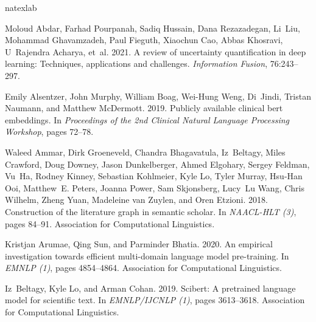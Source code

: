 \documentclass[11pt]{article}
\begin{document}
\vspace{-4mm}
\begin{thebibliography}{59}
\expandafter\ifx\csname natexlab\endcsname\relax\def\natexlab#1{#1}\fi

Moloud Abdar, Farhad Pourpanah, Sadiq Hussain, Dana Rezazadegan, Li~Liu,
  Mohammad Ghavamzadeh, Paul Fieguth, Xiaochun Cao, Abbas Khosravi, U~Rajendra
  Acharya, et~al. 2021.
\newblock A review of uncertainty quantification in deep learning: Techniques,
  applications and challenges.
\newblock \emph{Information Fusion}, 76:243--297.

Emily Alsentzer, John Murphy, William Boag, Wei-Hung Weng, Di~Jindi, Tristan
  Naumann, and Matthew McDermott. 2019.
\newblock Publicly available clinical bert embeddings.
\newblock In \emph{Proceedings of the 2nd Clinical Natural Language Processing
  Workshop}, pages 72--78.

Waleed Ammar, Dirk Groeneveld, Chandra Bhagavatula, Iz~Beltagy, Miles Crawford,
  Doug Downey, Jason Dunkelberger, Ahmed Elgohary, Sergey Feldman, Vu~Ha,
  Rodney Kinney, Sebastian Kohlmeier, Kyle Lo, Tyler Murray, Hsu{-}Han Ooi,
  Matthew~E. Peters, Joanna Power, Sam Skjonsberg, Lucy~Lu Wang, Chris Wilhelm,
  Zheng Yuan, Madeleine van Zuylen, and Oren Etzioni. 2018.
\newblock Construction of the literature graph in semantic scholar.
\newblock In \emph{{NAACL-HLT} {(3)}}, pages 84--91. Association for
  Computational Linguistics.

Kristjan Arumae, Qing Sun, and Parminder Bhatia. 2020.
\newblock An empirical investigation towards efficient multi-domain language
  model pre-training.
\newblock In \emph{{EMNLP} {(1)}}, pages 4854--4864. Association for
  Computational Linguistics.

Iz~Beltagy, Kyle Lo, and Arman Cohan. 2019.
\newblock Scibert: {A} pretrained language model for scientific text.
\newblock In \emph{{EMNLP/IJCNLP} {(1)}}, pages 3613--3618. Association for
  Computational Linguistics.


\end{thebibliography}
\end{document}
